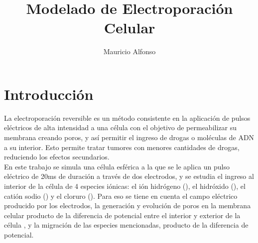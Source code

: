 \documentclass[a4paper,10pt]{article}
\title{Modelado de Electroporación Celular}
\author{Mauricio Alfonso}
\begin{document}
\newcommand{\h}{\ce{H^+}}
\newcommand{\oh}{\ce{OH^-}}
\newcommand{\na}{\ce{Na^+}}
\newcommand{\cl}{\ce{Cl^-}}
\newcommand{\kvm}{$\si{\kilo\volt\per\metre}$}
\newcommand{\usec}{$\si{\micro\second}$}

%

\maketitle

%
%
%

\section{Introducción}

La electroporación reversible es un método consistente en la aplicación de pulsos eléctricos de alta intensidad a una célula con el objetivo de permeabilizar su membrana creando poros, y así permitir el ingreso de drogas o moléculas de ADN a su interior. Esto permite tratar tumores con menores cantidades de drogas, reduciendo los efectos secundarios.\\


En este trabajo se simula una célula esférica a la que se le aplica un pulso eléctrico de 20\si{\milli\second} de duración a través de dos electrodos, y se estudia el ingreso al interior de la célula de 4 especies iónicas: el ión hidrógeno (\h), el hidróxido (\oh), el catión sodio (\na) y el cloruro (\cl). Para eso se tiene en cuenta el campo eléctrico producido por los electrodos, la generación y evolución de poros en la membrana celular producto de la diferencia de potencial entre el interior y exterior de la célula , y la migración de las especies mencionadas, producto de la diferencia de potencial.\\
\end{document}
